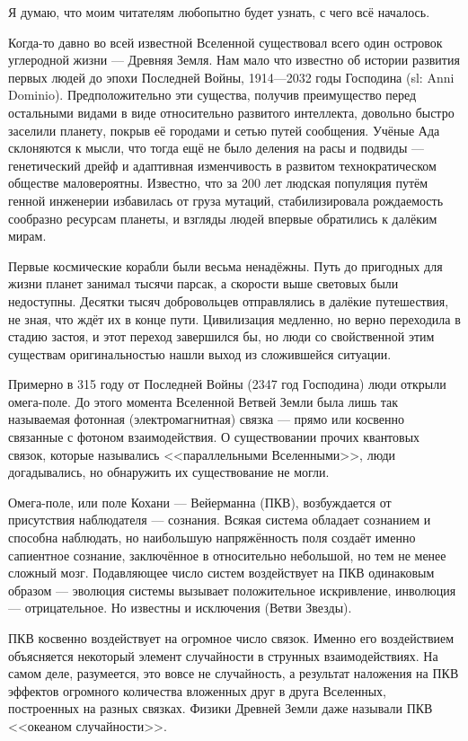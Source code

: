 \documentclass[a4paper,10pt]{book}
\begin{document}
Я думаю, что моим читателям любопытно будет узнать, с чего всё началось.

Когда-то давно во всей известной Вселенной существовал всего один островок 
углеродной жизни --- Древняя Земля. Нам мало что известно об истории развития 
первых людей до эпохи Последней Войны, 
1914---2032 годы Господина (sl: Anni Dominio). 
Предположительно эти существа, получив преимущество 
перед остальными видами в виде относительно развитого интеллекта, довольно 
быстро заселили планету, покрыв её городами и сетью путей сообщения. Учёные Ада 
склоняются к мысли, что тогда ещё не было деления на расы и подвиды --- 
генетический дрейф и адаптивная изменчивость в развитом технократическом 
обществе маловероятны. Известно, что за 200 лет 
людская популяция путём генной инженерии избавилась от груза мутаций, 
стабилизировала рождаемость сообразно ресурсам планеты, и взгляды людей впервые 
обратились к далёким мирам.

Первые космические корабли были весьма ненадёжны. Путь до пригодных для 
жизни планет занимал тысячи парсак, а скорости выше световых были недоступны. 
Десятки тысяч добровольцев отправлялись в далёкие путешествия, не зная, что 
ждёт их в конце пути. 
Цивилизация медленно, но верно 
переходила в стадию застоя, и этот переход завершился бы, но люди со 
свойственной этим существам оригинальностью нашли выход из сложившейся ситуации.

Примерно в 315 году от Последней Войны (2347 год Господина) люди открыли 
омега-поле.
До этого момента Вселенной Ветвей Земли была лишь так называемая фотонная 
(электромагнитная) связка --- 
прямо или косвенно связанные с фотоном взаимодействия. О существовании прочих 
квантовых связок,
которые назывались <<параллельными Вселенными>>, люди догадывались, но 
обнаружить их существование не могли. 

Омега-поле, или поле Кохани --- Вейерманна (ПКВ), возбуждается от присутствия 
наблюдателя --- сознания. Всякая система обладает сознанием и способна 
наблюдать, но наибольшую напряжённость поля создаёт именно сапиентное сознание,
заключённое в относительно небольшой, но тем не менее сложный мозг.
Подавляющее число систем воздействует на ПКВ одинаковым образом --- эволюция 
системы вызывает положительное искривление, инволюция --- отрицательное. Но 
известны и исключения (Ветви Звезды).

ПКВ косвенно воздействует на огромное число связок. Именно его воздействием 
объясняется некоторый элемент случайности в струнных взаимодействиях. На самом 
деле, разумеется, это вовсе не случайность, а результат наложения на ПКВ 
эффектов огромного количества вложенных друг в друга Вселенных, построенных на 
разных связках. Физики Древней Земли даже называли ПКВ <<океаном случайности>>.
\end{document}

